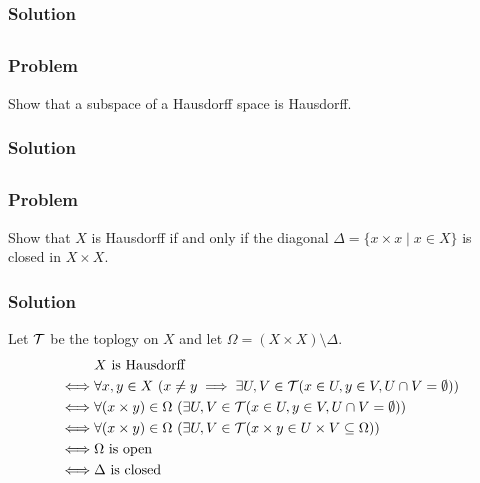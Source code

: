 \subsubsection{Solution}
\todo


\subsection{}

\subsubsection{Problem}
Show that a subspace of a Hausdorff space is Hausdorff.

\subsubsection{Solution}
\todo


\subsection{}

\subsubsection{Problem}
Show that $X$ is Hausdorff if and only if the diagonal $\Delta = \{x \times x \mid x \in X\}$ is closed in $X \times X$.

\subsubsection{Solution}
Let $\mathcal T$ be the toplogy on $X$ and let $\Omega = (X \times X) \setminus \Delta$.
\begin{align*}
& X \textrm{ is Hausdorff} \\
\iff& \forall x,y \in X \ (x \neq y \implies \exists U, V \in \mathcal T (x \in U, y \in V, U \cap V = \emptyset)) \\
\iff& \forall (x \times y) \in \Omega \ ( \exists U, V \in \mathcal T (x \in U, y \in V, U \cap V = \emptyset)) \\
\iff& \forall (x \times y) \in \Omega \ ( \exists U, V \in \mathcal T ( x \times y \in U \times V \subseteq \Omega)) \\
\iff& \Omega \textrm{ is open} \\
\iff& \Delta \textrm{ is closed}
\end{align*}

